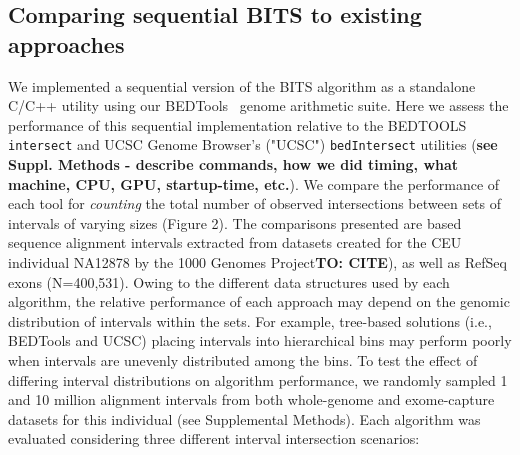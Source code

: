 \documentclass{bioinfo}
\begin{document}
\subsection{Comparing sequential BITS to existing approaches}
We implemented a sequential version of the BITS algorithm as a standalone C/C++
utility using our BEDTools~\citep{quinlan2010} genome arithmetic suite. Here we
assess the performance of this sequential implementation relative to the
BEDTOOLS \texttt{intersect} and UCSC Genome Browser's ("UCSC") \citep{kent2002}
\texttt{bedIntersect} utilities (\textbf{see Suppl. Methods - describe commands,
how we did timing, what machine, CPU, GPU, startup-time, etc.}).  We compare the
performance of each tool for \emph{counting} the total number of observed
intersections between sets of intervals of varying sizes (Figure 2). The
comparisons presented are based sequence alignment intervals extracted from
datasets created for the CEU individual NA12878 by the 1000 Genomes
Project\textbf{TO: CITE}), as well as RefSeq exons (N=400,531). Owing to the
different data structures used by each algorithm, the relative performance of
each approach may depend on the genomic distribution of intervals within the
sets.  For example, tree-based solutions (i.e., BEDTools and UCSC) placing
intervals into hierarchical bins may perform poorly when intervals are unevenly
distributed among the bins. To test the effect of differing interval
distributions on algorithm performance, we randomly sampled 1 and 10 million
alignment intervals from both whole-genome and exome-capture datasets for this
individual (see Supplemental Methods). Each algorithm was evaluated considering
three different interval intersection scenarios:
\end{document}
